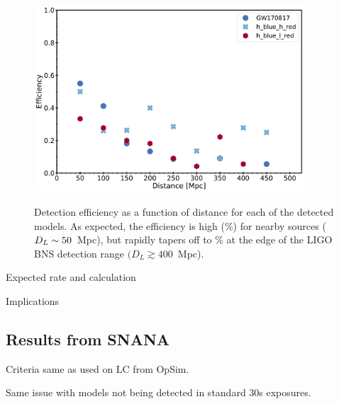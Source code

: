 \begin{figure}[!t]
\begin{center}
\hspace*{-0.1in}
\scalebox{1.}
{\includegraphics[width=0.9\textwidth]{./figs/chapter6/f3.pdf}}
\caption{\singlespace Detection efficiency as a function of distance for each of the detected models. As expected, the efficiency is high (\%) for nearby sources ($D_L \sim 50$~Mpc), but rapidly tapers off to \% at the edge of the LIGO BNS detection range $(D_L \gtrsim 400$~Mpc).}
\label{fig:ch6_dist_eff}
\end{center}
\end{figure}

Expected rate and calculation

Implications

\subsection{Results from SNANA}
\label{sec:ch6_too_results}
Criteria same as used on LC from OpSim.

Same issue with models not being detected in standard 30s exposures. 

